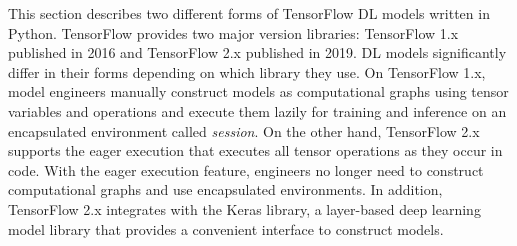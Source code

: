 This section describes two different forms of TensorFlow DL models written in
Python.
TensorFlow provides two major version libraries: TensorFlow 1.x published in
2016 and TensorFlow 2.x published in 2019. 
DL models significantly differ in their forms depending on which library
they use. 
On TensorFlow 1.x, model engineers manually construct models as computational
graphs using tensor variables and operations and execute them lazily  for
training and inference on an encapsulated environment
called {\it session}.
On the other hand, TensorFlow 2.x supports the eager execution that executes
all tensor operations as they occur in code. 
With the eager execution feature, engineers no longer need to construct
computational graphs and use encapsulated environments.
In addition, TensorFlow 2.x integrates with the Keras library, a layer-based
deep learning model library that provides a convenient interface to construct
models.

